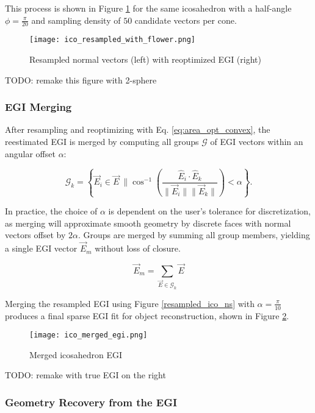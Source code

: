 This process is shown in Figure \ref{fig:resampled_ico_ns} for the same icosahedron with a half-angle $\phi = \frac{\pi}{20}$ and sampling density of $50$ candidate vectors per cone.

\begin{figure}[!htb]
  \centering
  \texttt{[image: ico\_resampled\_with\_flower.png]}
  \caption{Resampled normal vectors (left) with reoptimized EGI (right)}
  \label{fig:resampled_ico_ns}
\end{figure}

TODO: remake this figure with 2-sphere

\subsubsection{EGI Merging}

After resampling and reoptimizing with Eq. \ref{eq:area_opt_convex}, the reestimated EGI is merged by computing all groups $\mathcal{G}$ of EGI vectors within an angular offset $\alpha$:

\begin{equation}
  \mathcal{G}_k = \left\{ \vec{E}_i \in \vec{E} \:\| \cos^{-1}\left( \frac{\hat{E}_i \cdot \hat{E}_k}{\|\vec{E}_i \| \| \vec{E}_k \|}\right) < \alpha \right\}.
\end{equation}

In practice, the choice of $\alpha$ is dependent on the user's tolerance for discretization, as merging will approximate smooth geometry by discrete faces with normal vectors offset by $2\alpha$. Groups are merged by summing all group members, yielding a single EGI vector $\vec{E}_m$ without loss of closure. 

\begin{equation} \label{eq:fixing_egi}
  \vec{E}_m = \sum_{\vec{E} \in \mathcal{G}_k}{\vec{E}}
\end{equation}

Merging the resampled EGI using Figure \ref{resampled_ico_ns} with $\alpha = \frac{\pi}{10}$ produces a final sparse EGI fit for object reconstruction, shown in Figure \ref{ico_merged_egi}. 

\begin{figure}[!htb]
  \centering
  \texttt{[image: ico\_merged\_egi.png]}
  \caption{Merged icosahedron EGI}
  \label{ico_merged_egi}
\end{figure}

TODO: remake with true EGI on the right

\subsubsection{Geometry Recovery from the EGI}

